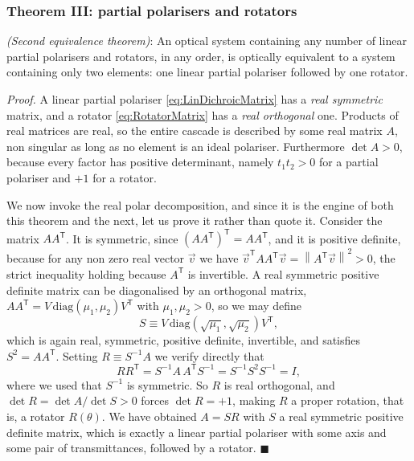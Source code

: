         \subsubsection{Theorem III: partial polarisers and rotators}

            \begin{myteo}
                \textit{(Second equivalence theorem)}: An optical system containing any number of linear partial polarisers and rotators, in any order, is optically equivalent to a system containing only two elements: one linear partial polariser followed by one rotator.
            \end{myteo}

            \textit{Proof.} A linear partial polariser \ref{eq:LinDichroicMatrix} has a \textit{real symmetric} matrix, and a rotator \ref{eq:RotatorMatrix} has a \textit{real orthogonal} one. Products of real matrices are real, so the entire cascade is described by some real matrix $A$, non singular as long as no element is an ideal polariser. Furthermore $\det A>0$, because every factor has positive determinant, namely $t_1t_2>0$ for a partial polariser and $+1$ for a rotator.

            We now invoke the real polar decomposition, and since it is the engine of both this theorem and the next, let us prove it rather than quote it. Consider the matrix $AA^{\mathsf{T}}$. It is symmetric, since $\left(AA^{\mathsf T}\right)^{\mathsf T}=AA^{\mathsf T}$, and it is positive definite, because for any non zero real vector $\vec{v}$ we have $\vec{v}^{\mathsf T}AA^{\mathsf T}\vec{v}=\left\|A^{\mathsf T}\vec{v}\right\|^2>0$, the strict inequality holding because $A^{\mathsf T}$ is invertible. A real symmetric positive definite matrix can be diagonalised by an orthogonal matrix, $AA^{\mathsf T}=V\,\text{diag}\left(\mu_1,\mu_2\right)V^{\mathsf T}$ with $\mu_1,\mu_2>0$, so we may define
            \begin{equation}\label{eq:RealSqrt}
                S \equiv V\,\text{diag}\left(\sqrt{\mu_1},\sqrt{\mu_2}\right)V^{\mathsf T} ,
            \end{equation}
            which is again real, symmetric, positive definite, invertible, and satisfies $S^2=AA^{\mathsf T}$. Setting $R\equiv S^{-1}A$ we verify directly that
            \begin{equation*}
                RR^{\mathsf T} = S^{-1}A\,A^{\mathsf T}S^{-1} = S^{-1}S^2S^{-1} = I ,
            \end{equation*}
            where we used that $S^{-1}$ is symmetric. So $R$ is real orthogonal, and $\det R=\det A/\det S>0$ forces $\det R=+1$, making $R$ a proper rotation, that is, a rotator $R(\theta)$. We have obtained $A=SR$ with $S$ a real symmetric positive definite matrix, which is exactly a linear partial polariser with some axis and some pair of transmittances, followed by a rotator. $\blacksquare$

